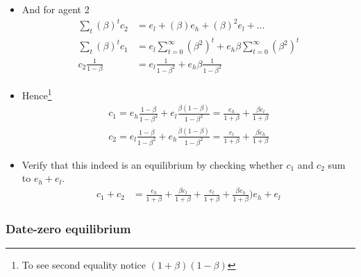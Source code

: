 \documentclass{scrartcl}
\begin{document}
\begin{itemize}
\item And for agent 2
	\begin{align}
	\sum_t \left( \beta \right)^t c_{2}&=e_l+\left( \beta \right)e_h+\left( \beta \right)^2e_l+\dots \\
	\sum_t \left( \beta \right)^t c_{1}&=e_l\sum_{t=0}^{\infty} (\beta^2)^t+e_h \beta \sum_{t=0}^{\infty} (\beta^2)^t\\
	c_{2}\frac{1}{1-\beta}&=e_l\frac{1}{1-\beta^2}+e_h\beta\frac{1}{1-\beta^2}
	\end{align}
	\item Hence\footnote{To see second equality notice $(1+\beta)(1-\beta)$}
		\begin{align}
		c_{1}=e_h\frac{1-\beta}{1-\beta^2}+e_l\frac{\beta(1-\beta)}{1-\beta^2}=\frac{e_h}{1+\beta}+\frac{\beta e_l}{1+\beta} \\
		c_{2}=e_l\frac{1-\beta}{1-\beta^2}+e_h\frac{\beta(1-\beta)}{1-\beta^2}=\frac{e_l}{1+\beta}+\frac{\beta e_h}{1+\beta} 
		\end{align}
	
	\item Verify that this indeed is an equilibrium by checking whether $c_1$ and $c_2$ sum to $e_h+e_l$.
	\begin{align}
		c_1+c_2&=\frac{e_h}{1+\beta}+\frac{\beta e_l}{1+\beta}+\frac{e_l}{1+\beta}+\frac{\beta e_h}{1+\beta} ) e_h+e_l
	\end{align}
		
\end{itemize}

\subsubsection*{Date-zero equilibrium}
\end{document}
